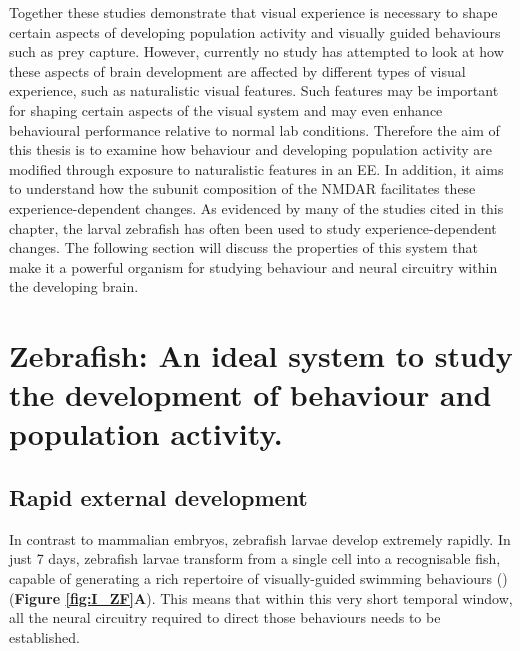 Together these studies demonstrate that visual experience is necessary to shape certain aspects of developing population activity and visually guided behaviours such as prey capture. However, currently no study has attempted to look at how these aspects of brain development are affected by different types of visual experience, such as naturalistic visual features. Such features may be important for shaping certain aspects of the visual system and may even enhance behavioural performance relative to normal lab conditions. Therefore the aim of this thesis is to examine how behaviour and developing population activity are modified through exposure to naturalistic features in an EE. In addition, it aims to understand how the subunit composition of the NMDAR facilitates these experience-dependent changes. As evidenced by many of the studies cited in this chapter, the larval zebrafish has often been used to study experience-dependent changes. The following section will discuss the properties of this system that make it a powerful organism for studying behaviour and neural circuitry within the developing brain.

\section{Zebrafish: An ideal system to study the development of behaviour and population activity.}

\subsection{Rapid external development}
 In contrast to mammalian embryos, zebrafish larvae develop extremely rapidly. In just 7 days, zebrafish larvae transform from a single cell into a recognisable fish, capable of generating a rich repertoire of visually-guided swimming behaviours (\cite{Orger2017ZebrafishChallenges}) (\textbf{Figure \ref{fig:I_ZF}A}). This means that within this very short temporal window, all the neural circuitry required to direct those behaviours needs to be established.

